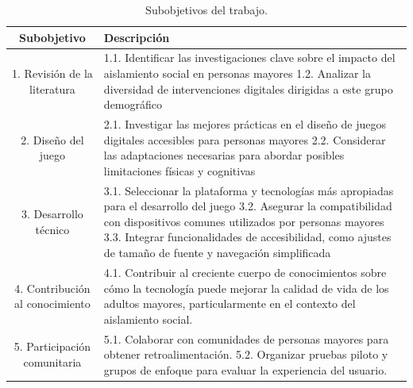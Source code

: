 \begin{table}[ht]
  \centering
  \begin{tabular}{| c | p{9.6cm} |}
    \hline
    \rowcolor{lightgray}
    \textbf{Subobjetivo} & \textbf{Descripción} \\
    \hline
    1. Revisión de la literatura & 
        1.1. Identificar las investigaciones clave sobre el impacto del aislamiento social en personas mayores \newline
        \vspace{0.2cm}
        1.2. Analizar la diversidad de intervenciones digitales dirigidas a este grupo demográfico \vspace{0.2cm} \\
    \hline
    2. Diseño del juego &
        2.1. Investigar las mejores prácticas en el diseño de juegos digitales accesibles para personas mayores \newline
        \vspace{0.2cm}
        2.2. Considerar las adaptaciones necesarias para abordar posibles limitaciones físicas y cognitivas
        \vspace{0.2cm} \\
    \hline
    3. Desarrollo técnico & 
        3.1. Seleccionar la plataforma y tecnologías más apropiadas para el desarrollo del juego \newline
        \vspace{0.2cm}
        3.2. Asegurar la compatibilidad con dispositivos comunes utilizados por personas mayores \newline
        \vspace{0.2cm}
        3.3. Integrar funcionalidades de accesibilidad, como ajustes de tamaño de fuente y navegación simplificada \vspace{0.2cm} \\
    \hline
    4. Contribución al conocimiento & 
    4.1. Contribuir al creciente cuerpo de conocimientos sobre cómo la tecnología puede mejorar la calidad de vida de los adultos mayores, particularmente en el contexto del aislamiento social. 
    \vspace{0.2cm} \\
    \hline
    5. Participación comunitaria & 
        5.1. Colaborar con comunidades de personas mayores para obtener retroalimentación. \newline
        \vspace{0.2cm}
        5.2. Organizar pruebas piloto y grupos de enfoque para evaluar la experiencia del usuario. \vspace{0.2cm} \\
    \hline
    \end{tabular}
  \caption{Subobjetivos del trabajo.}
  \label{tab:subobjetivos}
\end{table}